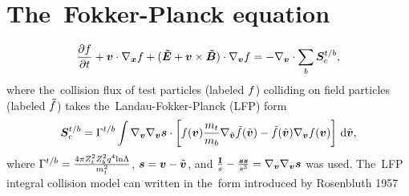 \begin{acknowledgments}
\end{acknowledgments}

\appendix






\clearpage



\appendix
\section{The~Fokker-Planck equation}
\label{sed:FP}
\begin{equation}
  \frac{\partial{f}}{\partial{t}} + \boldsymbol{v}\cdot\nabla_{\boldsymbol{x}} f + (\boldsymbol{\tilde{E}} + \boldsymbol{v}\times\boldsymbol{\tilde{B}}) \cdot\nabla_{\boldsymbol{v}} f =
  - \nabla_{\boldsymbol{v}} \cdot \sum_{b}\boldsymbol{S}_c^{t/b} ,
  \nonumber
\end{equation}
where the~collision flux of test particles (labeled $f$) colliding on field
particles (labeled $\tilde{f}$) takes the~Landau-Fokker-Planck (LFP) form
\begin{equation}
  \boldsymbol{S}_c^{t/b} = \Gamma^{t/b}\int \nabla_{\boldsymbol{v}}\nabla_{\boldsymbol{v}}\boldsymbol{s} \cdot \left[ 
  f(\boldsymbol{v})\frac{m_t}{m_b}\nabla_{\tilde{\boldsymbol{v}}} \tilde{f}(\tilde{\boldsymbol{v}}) - \tilde{f}(\tilde{\boldsymbol{v}})\nabla_{\boldsymbol{v}} f(\boldsymbol{v})
  \right]\, \text{d}\tilde{\boldsymbol{v}} , \nonumber 
  \nonumber
\end{equation} 
where $\Gamma^{t/b} = \frac{4\pi Z_t^2Z_b^2 q^4 \text{ln}\Lambda}{m_t^2}$, $\boldsymbol{s} = \boldsymbol{v} - \tilde{\boldsymbol{v}}$, and 
$\frac{\mathbf{I}}{s} - \frac{\boldsymbol{s}\boldsymbol{s}}{s^3} = \nabla_{\boldsymbol{v}}\nabla_{\boldsymbol{v}}\boldsymbol{s}$ was used.
The~LFP integral collision model can written in the~form introduced by 
Rosenbluth 1957
